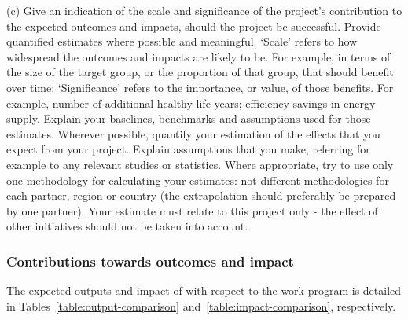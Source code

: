 \begin{draft}
{(c)	 Give an indication of the scale and significance of the project’s contribution to the expected outcomes and impacts, should the project be successful.  Provide quantified estimates where possible and meaningful.
	‘Scale’ refers to how widespread the outcomes and impacts are likely to be. For example, in terms of the size of the target group, or the proportion of that group, that should benefit over time; ‘Significance’ refers to the importance, or value, of those benefits. For example, number of additional healthy life years; efficiency savings in energy supply.
	Explain your baselines, benchmarks and assumptions used for those estimates. Wherever possible, quantify your estimation of the effects that you expect from your project. Explain assumptions that you make, referring for example to any relevant studies or statistics. Where appropriate, try to use only one methodology for calculating your estimates: not different methodologies for each partner, region or country (the extrapolation should preferably be prepared by one partner).
	Your estimate must relate to this project only - the effect of other initiatives should not be taken into account.
}
\end{draft}



\subsubsection{Contributions towards outcomes and impact}
\label{sec:countributions-towards-outcome-and-impact}

The expected outputs and impact of \TheProject with respect to the
work program is detailed in Tables~\ref{table:output-comparison}
and~\ref{table:impact-comparison}, respectively.

